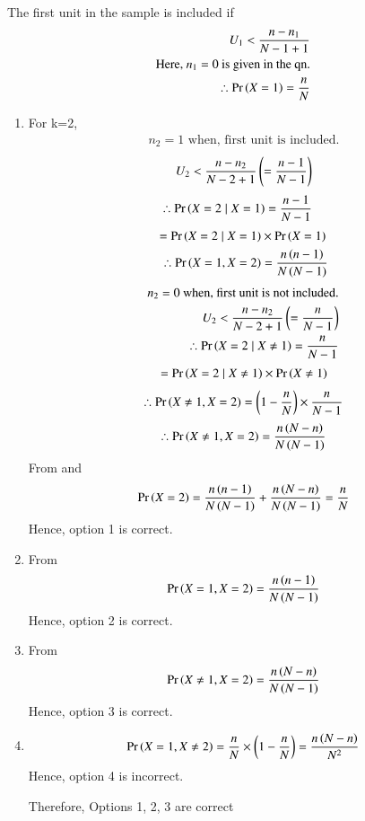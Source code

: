 \documentclass[journal,12pt,twocolumn]{IEEEtran}
\begin{document}
The first unit in the sample is included if
\begin{align}
    U_1 < \frac{n-n_1}{N-1+1}  
    \\\text{Here, } n_1=0 \text{ is given in the qn.}
    \\\therefore \Pr\left(X=1\right) = \frac{n}{N}
\end{align}
\begin{enumerate}
    \item For k=2, 
\begin{align}
    n_2 = 1 \text{ when, first unit is included.}
\end{align}
\begin{align}
    U_2 < \frac{n-n_2}{N-2+1} \left( = \frac{n-1}{N-1}\right)
\end{align}
\begin{align}
    \therefore \Pr\left(X=2 \mid X=1\right) &= \frac{n-1}{N-1}
\end{align}
\begin{align}
     = \Pr\left(X=2 \mid X=1\right) &\times \Pr\left(X=1\right)
    \\\therefore \Pr\left(X=1, X=2\right) &= \frac{n \left(n-1\right)}{N \left(N-1\right)}
\end{align}
\begin{align}
    n_2 = 0 \text{ when, first unit is not included.}
    \\U_2 < \frac{n-n_2}{N-2+1} \left(= \frac{n}{N-1}\right)
    \\\therefore \Pr\left(X=2 \mid X\neq 1\right) = \frac{n}{N-1}
\end{align}
\begin{align}
     = \Pr\left(X=2 \mid X\neq1\right) \times \Pr\left(X\neq1\right)
\end{align}
\begin{align}
    \therefore \Pr\left(X\neq1,X=2\right) = \left(1-\frac{n}{N}\right)\times\frac{n}{N-1}
\end{align}
\begin{align}
    \therefore \Pr\left(X\neq1,X=2\right) = \frac{n \left(N-n\right)}{N \left(N-1\right)}
\end{align}
From  and 
\begin{align}
    \Pr\left(X=2\right) = \frac{n \left(n-1\right)}{N \left(N-1\right)} + \frac{n \left(N-n\right)}{N \left(N-1\right)} = \frac{n}{N}
\end{align}
Hence, option 1 is correct.
\item From  
\begin{align}
    \Pr\left(X=1, X=2\right) = \frac{n \left(n-1\right)}{N \left(N-1\right)}
\end{align}
Hence, option 2 is correct.
\item From  
\begin{align}
    \Pr\left(X\neq1,X=2\right) = \frac{n \left(N-n\right)}{N \left(N-1\right)}
\end{align}
Hence, option 3 is correct.
\item 
\begin{align}
\Pr\left(X=1, X\neq2\right) = \frac{n}{N} \times \left(1-\frac{n}{N}\right) = \frac{n \left(N-n\right)}{N^2}
\end{align}
Hence, option 4 is incorrect.

Therefore, Options 1, 2, 3 are correct
\end{enumerate}
\end{document}
